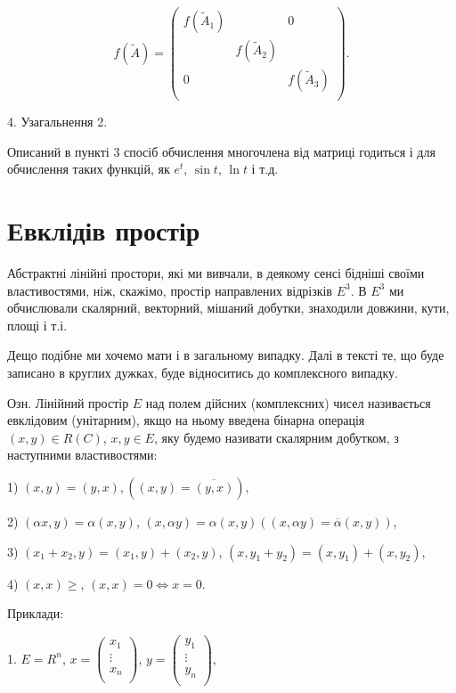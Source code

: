 $$f(\tilde{A}) = \begin{pmatrix}
	f(\tilde{A}_1) &                & 0              \\
	               & f(\tilde{A}_2) &                \\
	0              &                & f(\tilde{A}_3) \\
\end{pmatrix}.$$

4. Узагальнення 2.

Описаний в пункті 3 спосіб обчислення многочлена від матриці годиться і
для обчислення таких функцій, як $e^t$, $\sin t$, $\ln t$ і т.д. 

\section{Евклідів простір}

Абстрактні лінійні простори, які ми вивчали, в деякому сенсі бідніші
своїми властивостями, ніж, скажімо, простір направлених відрізків $E^3$. В $E^3$
ми обчислювали скалярний, векторний, мішаний добутки, знаходили
довжини, кути, площі і т.і. 

Дещо подібне ми хочемо мати і в загальному випадку. Далі в тексті те,
що буде записано в круглих дужках, буде відноситись до комплексного
випадку.

Озн. Лінійний простір $E$ над полем дійсних (комплексних) чисел
називається евклідовим (унітарним), якщо на ньому введена бінарна операція
$(x,y) \in R (C)$, $x,y \in E$, яку будемо називати скалярним добутком, з
наступними властивостями:

1) $(x,y) = (y,x), ((x,y) = \overline{(y,x)}),$

2) $(\alpha x, y) = \alpha(x, y)$, $(x, \alpha y) = \alpha(x, y) ((x, \alpha y) = \overline{\alpha}(x, y))$,

3) $(x_1 + x_2, y) = (x_1, y) + (x_2, y)$, $(x, y_1 + y_2) = (x, y_1) + (x, y_2)$,

4) $(x, x) \geqslant$, $(x,x) = 0 \Leftrightarrow x = 0$.

Приклади:

1. $E = R^n$, $x = \begin{pmatrix}
	x_1 \\
	\vdots \\
	x_n \\
\end{pmatrix}$, $y = \begin{pmatrix}
	y_1 \\
	\vdots \\
	y_n \\
\end{pmatrix}$,

